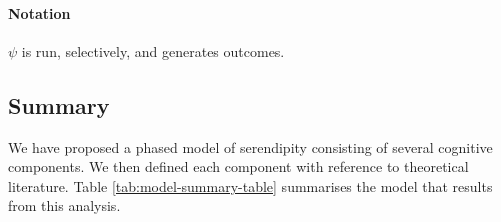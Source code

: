 \paragraph{\textbf{\upshape Notation}}

$\psi$ is run, selectively, and generates outcomes.

\subsection{Summary}
We have proposed a phased model of serendipity consisting of several
cognitive components.  We then defined each component with reference
to theoretical literature.  Table \ref{tab:model-summary-table}
summarises the model that results from this analysis.


